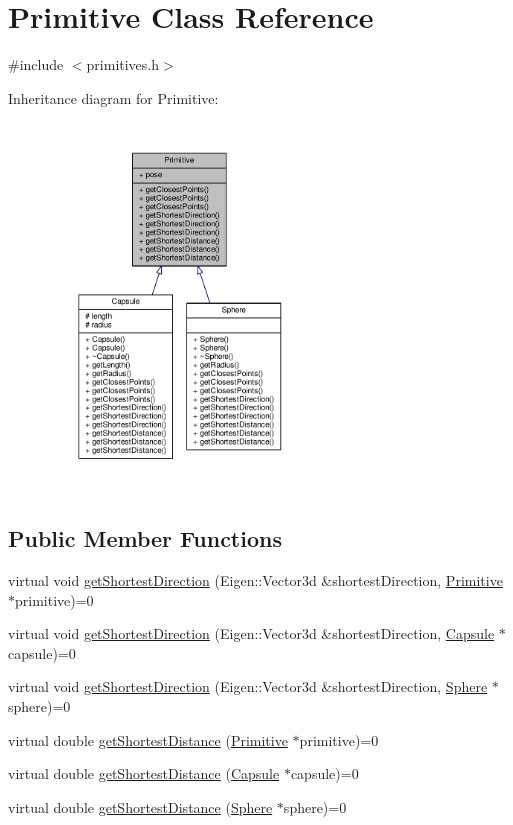 \hypertarget{class_primitive}{}\section{Primitive Class Reference}
\label{class_primitive}


{\ttfamily \#include $<$primitives.\+h$>$}



Inheritance diagram for Primitive\+:\nopagebreak
\begin{figure}[H]
\begin{center}
\leavevmode
\includegraphics[width=198pt]{class_primitive__inherit__graph}
\end{center}
\end{figure}
\subsection*{Public Member Functions}
\begin{DoxyCompactItemize}
\item 
virtual void \hyperlink{class_primitive_ae37bbdf5271bf278b19888e0428579a8}{get\+Shortest\+Direction} (Eigen\+::\+Vector3d \&shortest\+Direction, \hyperlink{class_primitive}{Primitive} $\ast$primitive)=0
\item 
virtual void \hyperlink{class_primitive_af9bd724a6618bd76e41e5682caa25023}{get\+Shortest\+Direction} (Eigen\+::\+Vector3d \&shortest\+Direction, \hyperlink{class_capsule}{Capsule} $\ast$capsule)=0
\item 
virtual void \hyperlink{class_primitive_a3f1bc91de29fa904657c1ba4c40eee53}{get\+Shortest\+Direction} (Eigen\+::\+Vector3d \&shortest\+Direction, \hyperlink{class_sphere}{Sphere} $\ast$sphere)=0
\item 
virtual double \hyperlink{class_primitive_a340b3e5540b910480ada939383985d66}{get\+Shortest\+Distance} (\hyperlink{class_primitive}{Primitive} $\ast$primitive)=0
\item 
virtual double \hyperlink{class_primitive_a46e60acfe4c005c0ec94e1e8b82d36db}{get\+Shortest\+Distance} (\hyperlink{class_capsule}{Capsule} $\ast$capsule)=0
\item 
virtual double \hyperlink{class_primitive_adaac4fc4fedf9cd76d4eb9c77e9ae560}{get\+Shortest\+Distance} (\hyperlink{class_sphere}{Sphere} $\ast$sphere)=0
\end{DoxyCompactItemize}
